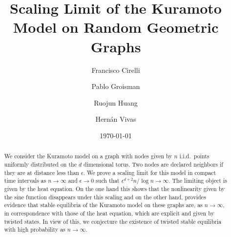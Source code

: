 \documentclass[a4paper,11pt]{amsart}
\numberwithin{equation}{section}
\numberwithin{theorem}{section}
\theoremstyle{definition}
\begin{document}

\title[Scaling Limit of the Kuramoto Model on Random Geometric Graphs]{Scaling Limit of the Kuramoto Model  on Random Geometric Graphs}

\author[F. Cirelli]{Francisco Cirelli}
\address{Departamento de Matem\'atica\hfill\break \indent Facultad de Ciencias Exactas y Naturales\hfill\break \indent Universidad de Buenos Aires\hfill\break \indent Buenos Aires, Argentina}

\author[P. Groisman]{Pablo Groisman}
\address{Departamento de Matem\'atica\hfill\break \indent Facultad de Ciencias Exactas y Naturales\hfill\break \indent Universidad de Buenos Aires\hfill\break \indent IMAS-UBA-CONICET\hfill\break \indent Buenos Aires, Argentina}

\author[R. Huang]{Ruojun Huang}
\address{Fachbereich Mathematik und Informatik\hfill\break \indent Universit\"at M\"unster \hfill\break \indent Einsteinstr. 62, M\"unster 48149, Germany.}

\author[H. Vivas]{Hern\'an Vivas}
\address{Centro Marplatense de Investigaciones Matem\'aticas/Conicet}
\address{De\'an Funes 3350, 7600, Mar del Plata, Argentina}



\begin{abstract}
We consider the Kuramoto model on a graph with nodes given by $n$ i.i.d.~points uniformly distributed on the $d$ dimensional torus. Two nodes are declared neighbors if they are at distance less than $\epsilon$. We prove a scaling limit for this model in compact time intervals as $n\to\infty$ and $\epsilon \to 0$ such that $\epsilon^{d+2}n/\log n \to \infty$. The limiting object is given by the heat equation. On the one hand this shows that the nonlinearity given by the sine function disappears under this scaling and on the other hand, provides evidence that stable equilibria of the Kuramoto model on these graphs are, as $n\to\infty$, in correspondence with those of the heat equation, which are explicit and given by twisted states. In view of this, we conjecture the existence of twisted stable equilibria with high probability as $n\to \infty$.
\end{abstract}
\date{\today}
\maketitle
\end{document}
